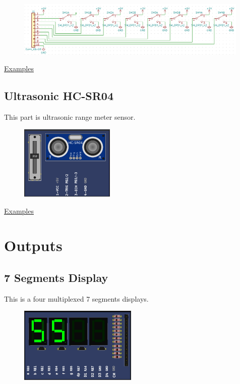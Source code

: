 \begin{figure}[H]
\center
\includegraphics[width=0.99\textwidth]{img/part_switchs_.png} 
\end{figure} 

\href{https://lcgamboa.github.io/picsimlab_examples/Parts.html\#Switchs}{Examples}



\subsection{Ultrasonic HC-SR04}
This part is ultrasonic range meter sensor.

\begin{figure}[H]
\center
\includegraphics[width=0.4\textwidth]{img/part_hcsr04.png} 
\end{figure} 


\href{https://lcgamboa.github.io/picsimlab_examples/Parts.html\#Ultrasonic_HC-SR04}{Examples}



\section{Outputs}

\subsection{7 Segments Display}

This is a four multiplexed 7 segments displays.

\begin{figure}[H]
\center
\includegraphics[width=0.5\textwidth]{img/part_7seg.png} 
\end{figure} 

